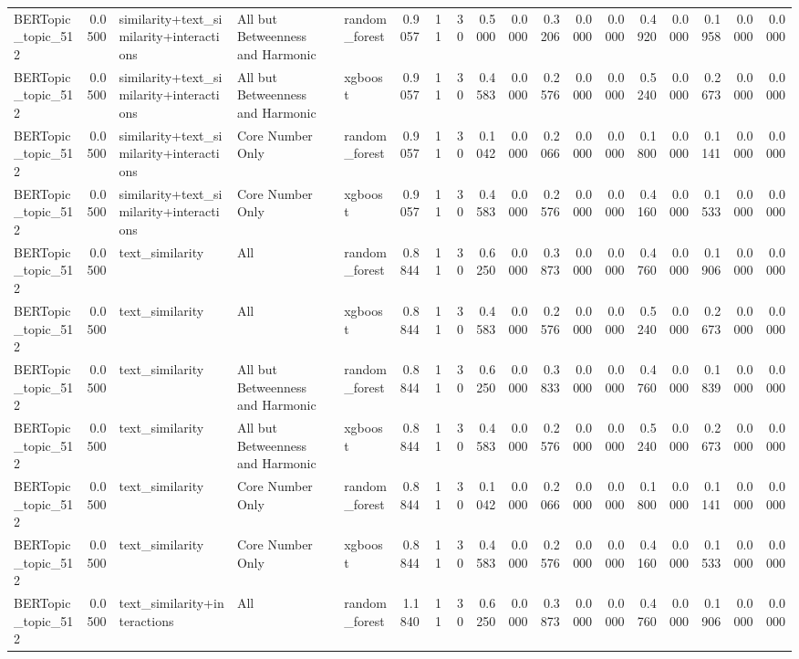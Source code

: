 \begin{tabular}{lrlllrrrrrrrrrrrrr}
BERTopic_topic_512 & 0.0500 & similarity+text_similarity+interactions & All but Betweenness and Harmonic & random_forest & 0.9057 & 11 & 30 & 0.5000 & 0.0000 & 0.3206 & 0.0000 & 0.0000 & 0.4920 & 0.0000 & 0.1958 & 0.0000 & 0.0000 \\
BERTopic_topic_512 & 0.0500 & similarity+text_similarity+interactions & All but Betweenness and Harmonic & xgboost & 0.9057 & 11 & 30 & 0.4583 & 0.0000 & 0.2576 & 0.0000 & 0.0000 & 0.5240 & 0.0000 & 0.2673 & 0.0000 & 0.0000 \\
BERTopic_topic_512 & 0.0500 & similarity+text_similarity+interactions & Core Number Only & random_forest & 0.9057 & 11 & 30 & 0.1042 & 0.0000 & 0.2066 & 0.0000 & 0.0000 & 0.1800 & 0.0000 & 0.1141 & 0.0000 & 0.0000 \\
BERTopic_topic_512 & 0.0500 & similarity+text_similarity+interactions & Core Number Only & xgboost & 0.9057 & 11 & 30 & 0.4583 & 0.0000 & 0.2576 & 0.0000 & 0.0000 & 0.4160 & 0.0000 & 0.1533 & 0.0000 & 0.0000 \\
BERTopic_topic_512 & 0.0500 & text_similarity & All & random_forest & 0.8844 & 11 & 30 & 0.6250 & 0.0000 & 0.3873 & 0.0000 & 0.0000 & 0.4760 & 0.0000 & 0.1906 & 0.0000 & 0.0000 \\
BERTopic_topic_512 & 0.0500 & text_similarity & All & xgboost & 0.8844 & 11 & 30 & 0.4583 & 0.0000 & 0.2576 & 0.0000 & 0.0000 & 0.5240 & 0.0000 & 0.2673 & 0.0000 & 0.0000 \\
BERTopic_topic_512 & 0.0500 & text_similarity & All but Betweenness and Harmonic & random_forest & 0.8844 & 11 & 30 & 0.6250 & 0.0000 & 0.3833 & 0.0000 & 0.0000 & 0.4760 & 0.0000 & 0.1839 & 0.0000 & 0.0000 \\
BERTopic_topic_512 & 0.0500 & text_similarity & All but Betweenness and Harmonic & xgboost & 0.8844 & 11 & 30 & 0.4583 & 0.0000 & 0.2576 & 0.0000 & 0.0000 & 0.5240 & 0.0000 & 0.2673 & 0.0000 & 0.0000 \\
BERTopic_topic_512 & 0.0500 & text_similarity & Core Number Only & random_forest & 0.8844 & 11 & 30 & 0.1042 & 0.0000 & 0.2066 & 0.0000 & 0.0000 & 0.1800 & 0.0000 & 0.1141 & 0.0000 & 0.0000 \\
BERTopic_topic_512 & 0.0500 & text_similarity & Core Number Only & xgboost & 0.8844 & 11 & 30 & 0.4583 & 0.0000 & 0.2576 & 0.0000 & 0.0000 & 0.4160 & 0.0000 & 0.1533 & 0.0000 & 0.0000 \\
BERTopic_topic_512 & 0.0500 & text_similarity+interactions & All & random_forest & 1.1840 & 11 & 30 & 0.6250 & 0.0000 & 0.3873 & 0.0000 & 0.0000 & 0.4760 & 0.0000 & 0.1906 & 0.0000 & 0.0000 \\

\end{tabular}
